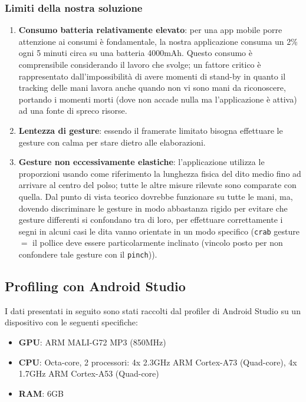 \subsubsection{Limiti della nostra soluzione}
\begin{enumerate}
    \item \textbf{Consumo batteria relativamente elevato}: per una app mobile porre attenzione ai consumi è fondamentale, la nostra applicazione consuma un 2\% ogni 5 minuti circa su una batteria 4000mAh. Questo consumo è comprensibile considerando il lavoro che svolge; un fattore critico è rappresentato dall'impossibilità di avere momenti di stand-by in quanto il tracking delle mani lavora anche quando non vi sono mani da riconoscere, portando i momenti morti (dove non accade nulla ma l'applicazione è attiva) ad una fonte di spreco risorse.
    \item \textbf{Lentezza di gesture}: essendo il framerate limitato bisogna effettuare le gesture con calma per stare dietro alle elaborazioni.
    \item \textbf{Gesture non eccessivamente elastiche}: l'applicazione utilizza le proporzioni usando come riferimento la lunghezza fisica del dito medio fino ad arrivare al centro del polso; tutte le altre misure rilevate sono comparate con quella. Dal punto di vista teorico dovrebbe funzionare su tutte le mani, ma, dovendo discriminare le gesture in modo abbastanza rigido per evitare che gesture differenti si confondano tra di loro, per effettuare correttamente i segni in alcuni casi le dita vanno orientate in un modo specifico (\texttt{crab} gesture $=$ il pollice deve essere particolarmente inclinato (vincolo posto per non confondere tale gesture con il \texttt{pinch})).
\end{enumerate}

\subsection{Profiling con Android Studio}
I dati presentati in seguito sono stati raccolti dal profiler di Android Studio su un dispositivo con le seguenti specifiche:
\begin{itemize}
    \item \textbf{GPU}: ARM MALI-G72 MP3 (850MHz)
    \item \textbf{CPU}: Octa-core, 2 processori: 4x 2.3GHz ARM Cortex-A73 (Quad-core), 4x 1.7GHz ARM Cortex-A53 (Quad-core)
    \item \textbf{RAM}: 6GB
\end{itemize}

